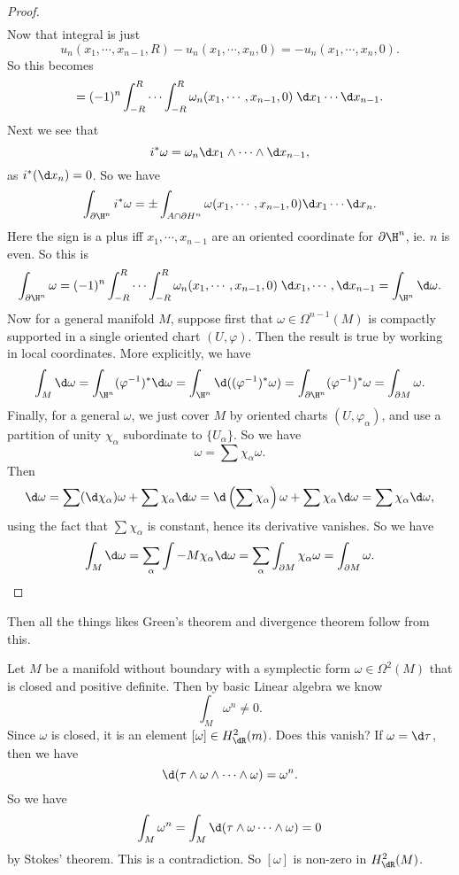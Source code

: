 \documentclass[a4paper]{article}
\begin{document}
\begin{proof}
\begin{align*}
  \end{align*}
  Now that integral is just
  \[
    u_n(x_1, \cdots, x_{n - 1}, R) - u_n(x_1, \cdots, x_n, 0) = -u_n(x_1, \cdots, x_n, 0).
  \]
  So this becomes
  \[
    =(-1)^n \int_{-R}^R \cdots \int_{-R}^R \omega_n(x_1, \cdots, x_{n - 1}, 0)\;\d x_1 \cdots \d x_{n - 1}.
  \]
  Next we see that
  \[
    i^* \omega = \omega_n \d x_1 \wedge \cdots \wedge \d x_{n - 1},
  \]
  as $i^*(\d x_n) = 0$. So we have
  \[
    \int_{\partial \H^n} i^* \omega = \pm \int_{A \cap \partial H^n} \omega(x_1, \cdots, x_{n - 1}, 0) \d x_1 \cdots \d x_n.
  \]
  Here the sign is a plus iff $x_1, \cdots, x_{n - 1}$ are an oriented coordinate for $\partial \H^n$, ie. $n$ is even. So this is
  \[
    \int_{\partial \H^n} \omega = (-1)^n \int_{-R}^R \cdots \int_{-R}^R \omega_n(x_1, \cdots, x_{n - 1}, 0)\;\d x_1, \cdots, \d x_{n - 1} = \int_{\H^n} \d \omega.
  \]
  Now for a general manifold $M$, suppose first that $\omega \in \Omega^{n - 1}(M)$ is compactly supported in a single oriented chart $(U, \varphi)$. Then the result is true by working in local coordinates. More explicitly, we have
  \[
    \int_M \d \omega = \int_{\H^n}(\varphi^{-1})^* \d \omega = \int_{\H^n} \d((\varphi^{-1})^* \omega) = \int_{\partial \H^n} (\varphi^{-1})^* \omega = \int_{\partial M} \omega.
  \]
  Finally, for a general $\omega$, we just cover $M$ by oriented charts $(U, \varphi_\alpha)$, and use a partition of unity $\chi_\alpha$ subordinate to $\{U_\alpha\}$. So we have
  \[
    \omega = \sum \chi_\alpha \omega.
  \]
  Then
  \[
    \d \omega = \sum (\d \chi_\alpha) \omega + \sum \chi_\alpha \d \omega = \d\left(\sum \chi_\alpha\right) \omega + \sum \chi_\alpha \d \omega = \sum \chi_\alpha \d \omega,
  \]
  using the fact that $\sum \chi_\alpha$ is constant, hence its derivative vanishes. So we have
  \[
    \int_M \d \omega = \sum_\alpha \int-M \chi_\alpha \d \omega = \sum_\alpha \int_{\partial M} \chi_\alpha \omega = \int_{\partial M}\omega. \qedhere
  \]
\end{proof}
Then all the things likes Green's theorem and divergence theorem follow from this.

\begin{eg}
  Let $M$ be a manifold without boundary with a symplectic form $\omega \in \Omega^2(M)$ that is closed and positive definite. Then by basic Linear algebra we know
  \[
    \int_M \omega^n \not= 0.
  \]
  Since $\omega$ is closed, it is an element $[\omega] \in H_{\dR}^2 (m)$. Does this vanish? If $\omega = \d \tau$, then we have
  \[
    \d (\tau \wedge \omega \wedge \cdots \wedge \omega) = \omega^n.
  \]
  So we have
  \[
    \int_M \omega^n = \int_M \d (\tau \wedge \omega \cdots \wedge \omega) = 0
  \]
  by Stokes' theorem. This is a contradiction. So $[\omega]$ is non-zero in $H^2_{\dR}(M)$.
\end{eg}
\end{document}
